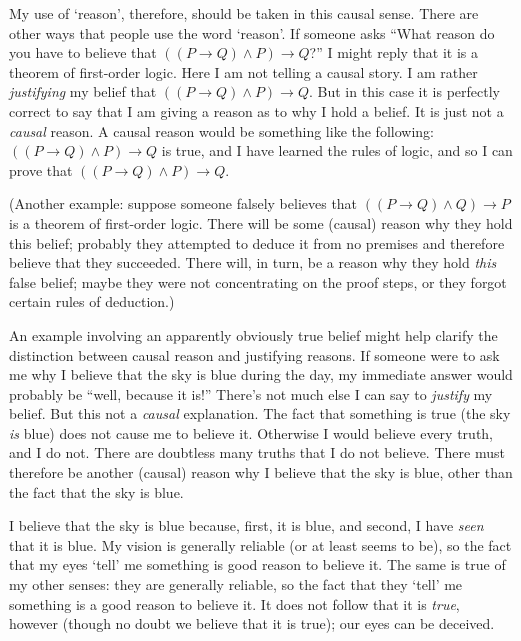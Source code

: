 \documentclass[11pt]{standalone}
\begin{document}
\begin{spacing}{1.5}
My use of `reason', therefore, should be taken in this causal sense.
There are other ways that people use the word `reason'.  If someone
asks ``What reason do you have to believe that $((P \rightarrow Q )
\wedge P) \rightarrow Q$?''  I might reply that it is a theorem of
first-order logic.  Here I am not telling a causal story.  I am rather
{\em justifying} my belief that $((P \rightarrow Q ) \wedge P)
\rightarrow Q$.  But in this case it is perfectly correct to say that
I am giving a reason as to why I hold a belief.  It is just not a {\em
  causal} reason.  A causal reason would be something like the
following: $((P \rightarrow Q ) \wedge P) \rightarrow Q$ is true, and
I have learned the rules of logic, and so I can prove that $((P
\rightarrow Q ) \wedge P) \rightarrow Q$.

(Another example: suppose someone falsely believes that $((P
\rightarrow Q ) \wedge Q) \rightarrow P$ is a theorem of first-order
logic.  There will be some (causal) reason why they hold this belief;
probably they attempted to deduce it from no premises and therefore
believe that they succeeded.  There will, in turn, be a reason why
they hold {\em this} false belief; maybe they were not concentrating
on the proof steps, or they forgot certain rules of deduction.)

An example involving an apparently obviously true belief might help
clarify the distinction between causal reason and justifying reasons.
If someone were to ask me why I believe that the sky is blue during
the day, my immediate answer would probably be ``well, because it
is!''  There's not much else I can say to {\em justify} my belief.
But this not a {\em causal} explanation.  The fact that something is
true (the sky {\em is} blue) does not cause me to believe it.
Otherwise I would believe every truth, and I do not.  There are
doubtless many truths that I do not believe.  There must therefore be
another (causal) reason why I believe that the sky is blue, other than
the fact that the sky is blue.

I believe that the sky is blue because, first, it is blue, and second,
I have {\em seen} that it is blue.  My vision is generally reliable
(or at least seems to be), so the fact that my eyes `tell' me
something is good reason to believe it.  The same is true of my other
senses: they are generally reliable, so the fact that they `tell' me
something is a good reason to believe it.  It does not follow that it
is {\em true}, however (though no doubt we believe that it is true);
our eyes can be deceived.


\end{spacing}
\end{document}
